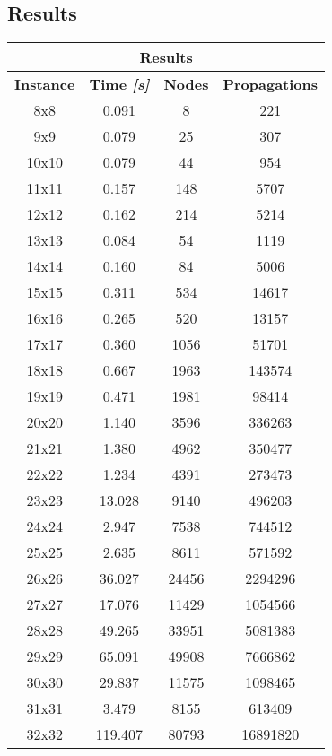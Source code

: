 \subsection{Results}
\begin{center}
    \begin{tabular}{|c|c|c|c|}
        \hline
        \multicolumn{4}{|c|}{\textbf{Results}} \\
        \hline
		\textbf{Instance} & \textbf{Time \textit{[s]}} & \textbf{Nodes} & \textbf{Propagations} \\
		\hline
		8x8 & 0.091 & 8 & 221 \\ \hline
		9x9 & 0.079 & 25 & 307 \\ \hline
		10x10 & 0.079 & 44 & 954 \\ \hline
		11x11 & 0.157 & 148 & 5707 \\ \hline
		12x12 & 0.162 & 214 & 5214 \\ \hline
		13x13 & 0.084 & 54 & 1119 \\ \hline
		14x14 & 0.160 & 84 & 5006 \\ \hline
		15x15 & 0.311 & 534 & 14617 \\ \hline
		16x16 & 0.265 & 520 & 13157 \\ \hline
		17x17 & 0.360 & 1056 & 51701 \\ \hline
		18x18 & 0.667 & 1963 & 143574 \\ \hline
		19x19 & 0.471 & 1981 & 98414 \\ \hline
		20x20 & 1.140 & 3596 & 336263 \\ \hline
		21x21 & 1.380 & 4962 & 350477 \\ \hline
		22x22 & 1.234 & 4391 & 273473 \\ \hline
		23x23 & 13.028 & 9140 & 496203 \\ \hline
		24x24 & 2.947 & 7538 & 744512 \\ \hline
		25x25 & 2.635 & 8611 & 571592 \\ \hline
		26x26 & 36.027 & 24456 & 2294296 \\ \hline
		27x27 & 17.076 & 11429 & 1054566 \\ \hline
		28x28 & 49.265 & 33951 & 5081383 \\ \hline
		29x29 & 65.091 & 49908 & 7666862 \\ \hline
		30x30 & 29.837 & 11575 & 1098465 \\ \hline
		31x31 & 3.479 & 8155 & 613409 \\ \hline
		32x32 & 119.407 & 80793 & 16891820 \\ \hline

\end{tabular}
\end{center}
